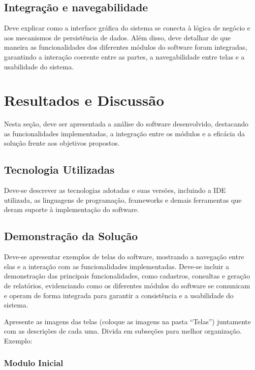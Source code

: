 \documentclass{article}
\begin{document}
\subsection{Integração e navegabilidade}

Deve explicar como a interface gráfica do sistema se conecta à lógica de negócio e aos mecanismos de persistência de dados. Além disso, deve detalhar de que maneira as funcionalidades dos diferentes módulos do software foram integradas, garantindo a interação coerente entre as partes, a navegabilidade entre telas e a usabilidade do sistema.

\section{Resultados e Discussão}
\label{sec:resultados}

Nesta seção, deve ser apresentada a análise do software desenvolvido, destacando as funcionalidades implementadas, a integração entre os módulos e a eficácia da solução frente aos objetivos propostos.

\subsection{Tecnologia Utilizadas}

Deve-se descrever as tecnologias adotadas e suas versões, incluindo a IDE utilizada, as linguagens de programação, frameworks e demais ferramentas que deram suporte à implementação do software.

\subsection{Demonstração da Solução}

Deve-se apresentar exemplos de telas do software, mostrando a navegação entre elas e a interação com as funcionalidades implementadas. Deve-se incluir a demonstração das principais funcionalidades, como cadastros, consultas e geração de relatórios, evidenciando como os diferentes módulos do software se comunicam e operam de forma integrada para garantir a consistência e a usabilidade do sistema.

Apresente as imagens das telas (coloque as imagens na pasta ``Telas'') juntamente com as descrições de cada uma. Divida em subseções para melhor organização. Exemplo:

\vspace{10mm}

\subsubsection{Modulo Inicial}
\end{document}
